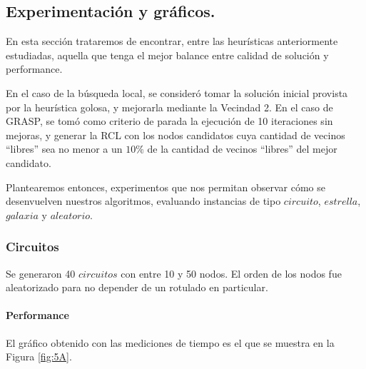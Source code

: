 \subsection{Experimentación y gráficos.}

\vspace*{0.3cm}

En esta sección trataremos de encontrar, entre las heurísticas anteriormente estudiadas, aquella que tenga el mejor balance entre calidad de solución y performance. 

En el caso de la búsqueda local, se consideró tomar la solución inicial provista por la heurística golosa, y mejorarla mediante la Vecindad 2. En el caso de GRASP, se tomó como criterio de parada la ejecución de 10 iteraciones sin mejoras, y generar la RCL con los nodos candidatos cuya cantidad de vecinos ``libres'' sea no menor a un $10 \%$ de la cantidad de vecinos ``libres'' del mejor candidato.

Plantearemos entonces, experimentos que nos permitan observar cómo se desenvuelven nuestros algoritmos, evaluando instancias de tipo $circuito$, $estrella$, $galaxia$ y $aleatorio$.
 
\subsubsection{Circuitos}

Se generaron 40 $circuitos$ con entre 10 y 50 nodos.  El orden de los nodos fue aleatorizado para no depender de un rotulado en particular.

\paragraph{Performance} 

El gráfico obtenido con las mediciones de tiempo es el que se muestra en la Figura \ref{fig:5A}.

